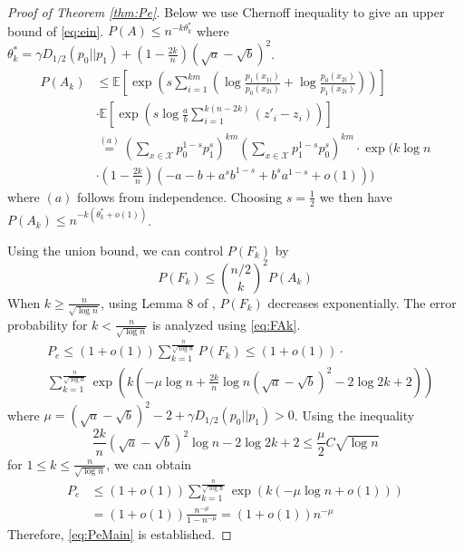 \documentclass[conference]{IEEEtran}
\begin{document}
\begin{proof}[Proof of Theorem \ref{thm:Pe}]
Below we use Chernoff inequality to give an upper bound of \eqref{eq:ein}.
$P(A) \leq n^{-k\theta^*_k}$ where $\theta^*_k=\gamma D_{1/2}(p_0||p_1)+(1-\frac{2k}{n})(\sqrt{a}-\sqrt{b})^2$.
\begin{align*}
P(A_k) &\leq \mathbb{E}[\exp \left( s\sum_{i=1}^{km}
\left( \log \frac{p_1(x_{1i})}{p_0(x_{2i})}
+ \log \frac{p_0(x_{2i})}{p_1(x_{2i})} \right) \right)]\\
&\cdot \mathbb{E}[\exp\left(s\log \frac{a}{b}\sum_{i=1}^{k(n-2k)} (z'_i - z_i )\right)] \\
& \stackrel{(a)}{=} (\sum_{x\in \mathcal{X}} p_0^{1-s}p_1^{s})^{km} (\sum_{x\in \mathcal{X}} p_1^{1-s}p_0^{s})^{km}\cdot \exp (k\log n \\
& \cdot (1-\frac{2k}{n})(-a-b+a^sb^{1-s}+b^sa^{1-s} +o(1)) )
\end{align*}
where $(a)$ follows from independence. Choosing $s=\frac{1}{2}$ we then have 
$P(A_k) \leq  n^{-k(\theta^*_k+o(1))}$.

Using the union bound, we can control $P(F_k)$ by
$$
P(F_k) \leq \binom{n/2}{k}^2 P(A_k)
$$
When $k \geq \frac{n}{\sqrt{\log n}}$, using Lemma 8 of \cite{feng2021},
$P(F_k)$ decreases exponentially. The error probability for $k < \frac{n}{\sqrt{\log n}}$
is analyzed using \eqref{eq:FAk}.
\begin{align*}
&P_e \leq (1+o(1))\sum_{k=1}^{\frac{n}{\sqrt{\log n}}} P(F_k) \leq (1+o(1)) \cdot \\
&\sum_{k=1}^{\frac{n}{\sqrt{\log n}}} \exp(k(-\mu \log n + \frac{2k}{n} \log n(\sqrt{a} - \sqrt{b})^2 - 2\log 2k + 2))
\end{align*}
where $\mu = (\sqrt{a} - \sqrt{b})^2-2 + \gamma D_{1/2}(p_0||p_1) > 0$.
Using the inequality
$$
\frac{2k}{n}(\sqrt{a} - \sqrt{b})^2\log n -2\log2k+2\leq \frac{\mu}{2} C\sqrt{\log n}
$$
for $1\leq k \leq \frac{n}{\sqrt{\log n}}$, we can obtain
\begin{align*}
P_e &\leq(1+o(1)) \sum_{k=1}^{\frac{n}{\sqrt{\log n}}} \exp(k(-\mu \log n + o(1))) \\
& =(1+o(1)) \frac{n^{-\mu}}{1-n^{-\mu }} = (1+o(1))n^{-\mu}
\end{align*}
Therefore, \eqref{eq:PeMain} is established.


\end{proof}
\end{document}
